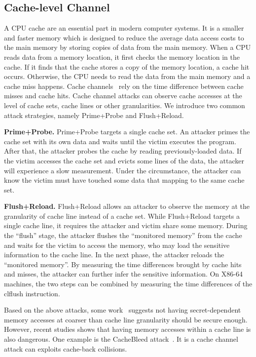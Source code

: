 \subsection{Cache-level Channel}
A CPU cache are an essential part in modern computer systems. It is a smaller and faster memory which is designed to reduce the average data access costs to the main memory by storing copies of data from the main memory. When a CPU reads data from a memory location, it first checks the memory location in the cache. If it finds that the cache stores a copy of the memory location, a cache hit occurs. Otherwise, the CPU needs to read the data from the main memory and a cache miss happens.
Cache channels~\cite{yarom2017cachebleed,191010,184415,Osvik2006,liu2015last,184415} rely on the time difference between cache misses and cache hits. Cache channel attacks can observe cache accesses at the level of cache sets, cache lines or other granularities. We introduce two common attack strategies, namely Prime+Probe and Flush+Reload. 

\textbf{Prime+Probe.} Prime+Probe targets a single cache set. 
An attacker primes the cache set with its own data and waits until the victim executes the program. After that, the attacker probes the cache by reading previously-loaded data. If the victim accesses the cache set and evicts some lines of the data, the attacker will experience a slow measurement. Under the circumstance, the attacker can know the victim must have touched some data that mapping to the same cache set.

\textbf{Flush+Reload.} Flush+Reload allows an attacker to observe the memory at the granularity of cache line instead of a cache set. While Flush+Reload targets a single cache line, it requires the attacker and victim share some memory. During the ``flush'' stage, the attacker flushes the ``monitored
memory'' from the cache and waits for the victim to access the memory, who may load the sensitive information to the cache line.  In the next phase,
the attacker reloads the ``monitored memory''. By measuring the time differences
brought by cache hits and misses, the attacker can further infer the sensitive information. On X86-64 machines, the two steps can be combined by measuring the time differences of the \textsf{clflush} instruction.

Based on the above attacks, some work~\cite{brickell2011technologies} suggests not having secret-dependent memory accesses at coarser than cache line granularity should be secure enough. However, recent studies shows that having memory accesses within a cache line is also dangerous. One example is the CacheBleed attack~\cite{yarom2017cachebleed}. It is a cache channel attack can exploits cache-back collisions.
